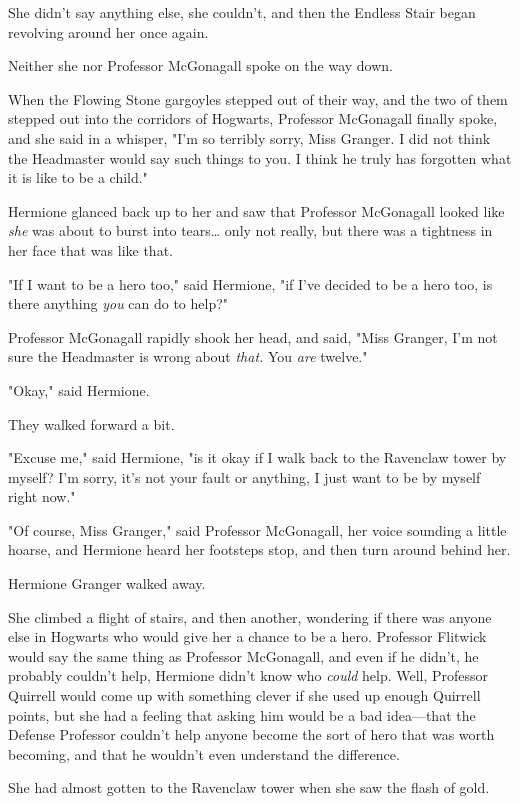 She didn't say anything else, she couldn't, and then the Endless Stair began
revolving around her once again.

Neither she nor Professor McGonagall spoke on the way down.

When the Flowing Stone gargoyles stepped out of their way, and the two of them
stepped out into the corridors of Hogwarts, Professor McGonagall finally spoke,
and she said in a whisper, "I'm so terribly sorry, Miss Granger. I did not
think the Headmaster would say such things to you. I think he truly has
forgotten what it is like to be a child."

Hermione glanced back up to her and saw that Professor McGonagall looked like
\emph{she} was about to burst into tears{\ldots} only not really, but there was
a tightness in her face that was like that.

"If I want to be a hero too," said Hermione, "if I've decided to be a hero too,
is there anything \emph{you} can do to help?"

Professor McGonagall rapidly shook her head, and said, "Miss Granger, I'm not
sure the Headmaster is wrong about \emph{that.} You \emph{are} twelve."

"Okay," said Hermione.

They walked forward a bit.

"Excuse me," said Hermione, "is it okay if I walk back to the Ravenclaw tower
by myself? I'm sorry, it's not your fault or anything, I just want to be by
myself right now."

"Of course, Miss Granger," said Professor McGonagall, her voice sounding a
little hoarse, and Hermione heard her footsteps stop, and then turn around
behind her.

Hermione Granger walked away.

She climbed a flight of stairs, and then another, wondering if there was anyone
else in Hogwarts who would give her a chance to be a hero. Professor Flitwick
would say the same thing as Professor McGonagall, and even if he didn't, he
probably couldn't help, Hermione didn't know who \emph{could} help. Well,
Professor Quirrell would come up with something clever if she used up enough
Quirrell points, but she had a feeling that asking him would be a bad
idea---that the Defense Professor couldn't help anyone become the sort of hero
that was worth becoming, and that he wouldn't even understand the difference.

She had almost gotten to the Ravenclaw tower when she saw the flash of gold.
